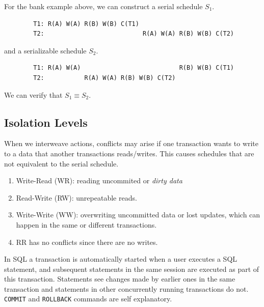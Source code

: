 \documentclass{article}
\begin{document}
    \begin{example}
      For the bank example above, we can construct a serial schedule $S_1$. 
      \begin{lstlisting}
        T1: R(A) W(A) R(B) W(B) C(T1)
        T2:                           R(A) W(A) R(B) W(B) C(T2)
      \end{lstlisting}
      and a serializable schedule $S_2$. 
      \begin{lstlisting}
        T1: R(A) W(A)                           R(B) W(B) C(T1)
        T2:           R(A) W(A) R(B) W(B) C(T2)
      \end{lstlisting}
      We can verify that $S_1 \equiv S_2$. 
    \end{example} 


  \subsection{Isolation Levels}

    When we interweave actions, conflicts may arise if one transaction wants to write to a data that another transactions reads/writes. This causes schedules that are not equivalent to the serial schedule. 
    \begin{enumerate}
      \item Write-Read (WR): reading uncommited or \textit{dirty data} 
      \item Read-Write (RW): unrepeatable reads. 
      \item Write-Write (WW): overwriting uncommitted data or lost updates, which can happen in the same or different transactions. 
      \item RR has no conflicts since there are no writes. 
    \end{enumerate}

    In SQL a transaction is automatically started when a user executes a SQL statement, and subsequent statements in the same session are executed as part of this transaction. Statements see changes made by earlier ones in the same transaction and statements in other concurrently running transactions do not. \texttt{COMMIT} and \texttt{ROLLBACK} commands are self explanatory.  
     
\end{document}
